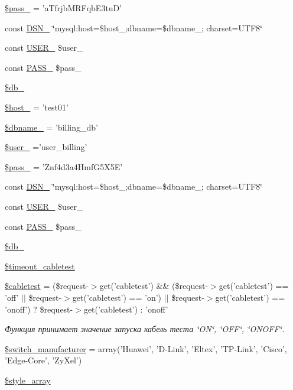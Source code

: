 \begin{DoxyCompactItemize}
\item 
\hyperlink{group___d_b__2_gab3a158e940b491fbf53fd8271fb05e45}{\$pass\-\_} = 'a\-Tfrjb\-M\-R\-Fqb\-E3tu\-D'
\item 
const \hyperlink{group___d_b__2_ga72e6fba3d74199ad6e7e817a61e4a14d}{D\-S\-N\-\_} \char`\"{}mysql\-:host=\$host\-\_;dbname=\$dbname\-\_; charset=U\-T\-F8\char`\"{}
\item 
const \hyperlink{group___d_b__2_ga92b63a34ae60895214a8f31ebb5e9b58}{U\-S\-E\-R\-\_} \$user\-\_
\item 
const \hyperlink{group___d_b__2_ga8b3fe80baea61cdf88958113cc16a363}{P\-A\-S\-S\-\_} \$pass\-\_
\item 
\hyperlink{group___d_b__2_ga35a69e2032e40a7d510004071c24c17c}{\$db\-\_}
\item 
\hyperlink{group___d_b__3_ga9782328ab4366de7daff22fe23704413}{\$host\-\_} = 'test01'
\item 
\hyperlink{group___d_b__3_ga0def194ad2413b876916149582a2b1e9}{\$dbname\-\_} = 'billing\-\_\-db'
\item 
\hyperlink{group___d_b__3_ga5f8fd50656344478702668d5de68e802}{\$user\-\_} ='user\-\_\-billing'
\item 
\hyperlink{group___d_b__3_gaaa7650887f2a6a859cb6420d9dba37f0}{\$pass\-\_} = 'Znf4d3a4\-Hmf\-G5\-X5\-E'
\item 
const \hyperlink{group___d_b__3_ga84e111746d69b14479dbf3f99b4e21ad}{D\-S\-N\-\_} \char`\"{}mysql\-:host=\$host\-\_;dbname=\$dbname\-\_; charset=U\-T\-F8\char`\"{}
\item 
const \hyperlink{group___d_b__3_gabb4d4077f995367d73794dcfd8c50a23}{U\-S\-E\-R\-\_} \$user\-\_
\item 
const \hyperlink{group___d_b__3_gad7bf3ef090d7da2ae80f4a5f3ab4e67c}{P\-A\-S\-S\-\_} \$pass\-\_
\item 
\hyperlink{group___d_b__3_ga86a3d1ce31d6a69ea9c6b655a3fb10a1}{\$db\-\_}
\item 
\hyperlink{group__timeout__cabletest_ga4bf51deec9851d3432a7b41ccb07f2c8}{\$timeout\-\_\-cabletest}
\item 
\hyperlink{group__on__off__cabletest_ga8a066b0c14b92b0fce632e27b8dd35c9}{\$cabletest} = (\$request-\/$>$get('cabletest') \&\& (\$request-\/$>$get('cabletest') == 'off' $\vert$$\vert$ \$request-\/$>$get('cabletest') == 'on') $\vert$$\vert$ \$request-\/$>$get('cabletest') == 'onoff') ? \$request-\/$>$get('cabletest') \-: 'onoff'
\begin{DoxyCompactList}\small\item\em Функция принимает значение запуска кабель теста \char`\"{}\-O\-N\char`\"{}, \char`\"{}\-O\-F\-F\char`\"{}, \char`\"{}\-O\-N\-O\-F\-F\char`\"{}. \end{DoxyCompactList}\item 
\hyperlink{group__switch__manufacturer_ga2b1ea6f804c1caa0c3e824412fe37b16}{\$switch\-\_\-manufacturer} = array('Huawei', 'D-\/Link', 'Eltex', 'T\-P-\/Link', 'Cisco', 'Edge-\/Core', 'Zy\-Xel')
\item 
\hyperlink{group__styles_ga3af2130ca49d5b6d94c67af0775e6a0b}{\$style\-\_\-array}
\end{DoxyCompactItemize}


